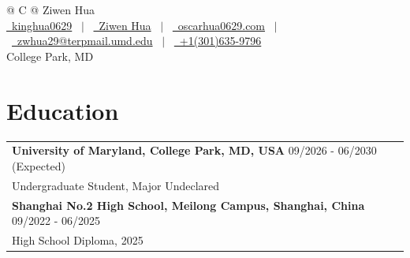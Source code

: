 \documentclass[letterpaper,10pt]{article}
\begin{document}
\pagestyle{empty}



\begin{tabularx}{\linewidth}{@{} C @{}}
    \Huge{Ziwen Hua}                                                                    \\[7.5pt]
    \href{https://github.com/kinghua0629}{\raisebox{-0.05\height}\faGithub\ kinghua0629} \ $|$ \
    \href{https://linkedin.com/in/ziwen-hua-625a6a3b4}{\raisebox{-0.05\height}\faLinkedin\ Ziwen Hua} \ $|$ \
    \href{https://oscarhua0629.com}{\raisebox{-0.05\height}\faGlobe \ oscarhua0629.com} \ $|$ \
    \href{mailto:zwhua29@terpmail.umd.edu}{\raisebox{-0.05\height}\faEnvelope \ zwhua29@terpmail.umd.edu} \ $|$ \
    \href{tel:+1(301)635-9796}{\raisebox{-0.05\height}\faMobile \ +1(301)635-9796}      \\
    College Park, MD
\end{tabularx}

\section{Education}
\begin{tabularx}{\linewidth}{@{}X@{}}
    \textbf{University of Maryland, College Park, MD, USA} \hfill 09/2026 - 06/2030 (Expected) \\
    Undergraduate Student, Major Undeclared \\[4pt]
    \textbf{Shanghai No.2 High School, Meilong Campus, Shanghai, China} \hfill 09/2022 - 06/2025 \\
    High School Diploma, 2025 \\
\end{tabularx}
\end{document}
